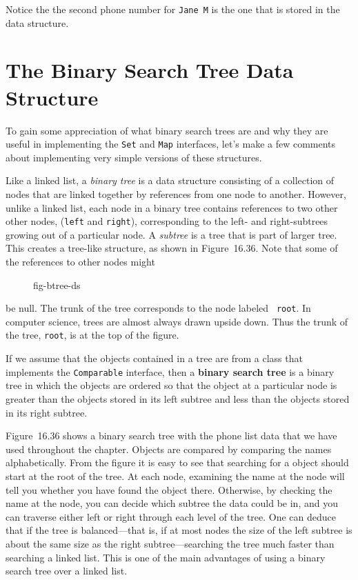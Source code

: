 \noindent Notice the the second phone number for {\tt Jane M} is the one that
is stored in the data structure.

\section{ The Binary Search Tree Data Structure}
\label{the-binary-search-tree-data-structure}

To gain some appreciation of what binary search trees are and why they
are useful in implementing the {\tt Set} and {\tt Map} interfaces, let's
make a few comments about implementing very simple versions of these 
structures.

Like a linked list, a {\em binary tree} is a data structure consisting
of a collection of nodes that are linked together by references from
one node to another.  However, unlike a linked list, each node in a
binary tree contains references to two other other nodes, ({\tt left}
and {\tt right}), corresponding to the left- and right-subtrees
growing out of a particular node.  A {\em subtree} is a tree that is
part of larger tree. This creates a tree-like structure, as shown in
Figure~16.36. Note that some of the references to other nodes might
\begin{figure}[h!]
 {fig-btree-ds}
\end{figure}
\noindent be null.  The trunk of the tree corresponds to the node labeled {\tt
root}. In computer science, trees are almost always drawn upside down.
Thus the trunk of the tree, {\tt root}, is at the top of the figure.

If we assume that the objects contained in a tree are from a class
that implements the {\tt Comparable} interface, then a {\bf binary
search tree} is a binary tree in which the objects are ordered so that
the object at a particular node is greater than the objects stored in
its left subtree and less than the objects stored in its right
subtree.

Figure~16.36 shows a binary search tree with the phone list data that
we have used throughout the chapter.  Objects are compared by
comparing the names alphabetically.  From the figure it is easy to see
that searching for a object should start at the root of the tree. At
each node, examining the name at the node will tell you whether you
have found the object there.  Otherwise, by checking the name at the
node, you can decide which subtree the data could be in, and you can
traverse either left or right through each level of the tree. One can
deduce that if the tree is balanced---that is, if at most nodes the
size of the left subtree is about the same size as the right
subtree---searching the tree much faster than searching a linked
list. This is one of the main advantages of using a binary search tree
over a linked list.  

